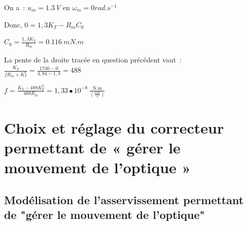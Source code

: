 \ifprof
\begin{corrige}
On a~: \(u_{m} = \SI{1,3}{V}\) en \(\omega_{m} = 0\si{rad.s^{-1}}\)
 
Donc, \(0 = 1,3K_{T} - R_{m}C_{0}\)

\(C_{0} = \frac{1,3K_{T}}{R_{m}} = \SI{0,116}{mN.m}\)

La pente de la droite tracée en question précédent vaut~:
\(\frac{K_{T}}{fR_{m} + K_{T}^{2}} = \frac{1730 - 0}{4,84 - 1,3} = 488\)

\(f = \frac{K_{T} - 488K_{T}^{2}}{488R_{m}} = 1,33 \bullet 10^{- 8}\ \frac{\text{N.m}}{\left( \frac{\text{rad}}{s} \right)}\)
\end{corrige}
\else
\fi

%
%
%
%
%
%
%
%
%


\section{Choix et réglage du correcteur permettant de « gérer le mouvement
de l’optique »}
\subsection{Modélisation de l'asservissement permettant de "gérer le mouvement de l'optique"}

